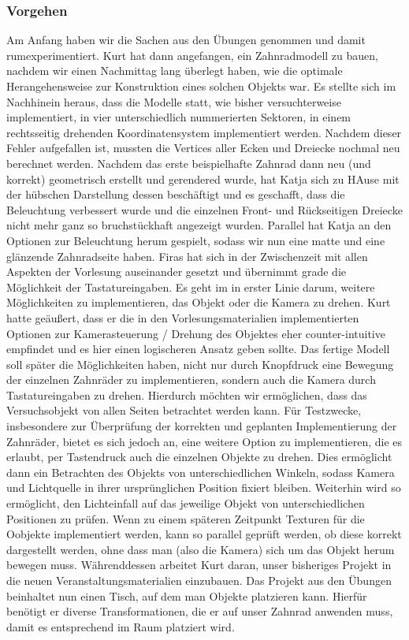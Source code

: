 \documentclass{article}
\begin{document}
\subsubsection{Vorgehen} %
Am Anfang haben wir die Sachen aus den Übungen genommen und damit rumexperimentiert. 
Kurt hat dann angefangen, ein Zahnradmodell zu bauen, nachdem wir einen Nachmittag lang überlegt haben, wie die optimale Herangehensweise zur Konstruktion eines solchen Objekts war. 
Es stellte sich im Nachhinein heraus, dass die Modelle statt, wie bisher versuchterweise implementiert, in vier unterschiedlich nummerierten Sektoren, in einem rechtsseitig drehenden Koordinatensystem implementiert werden. 
Nachdem dieser Fehler aufgefallen ist, mussten die Vertices aller Ecken und Dreiecke nochmal neu berechnet werden. 
Nachdem das erste beispielhafte Zahnrad dann neu (und korrekt) geometrisch erstellt und gerendered wurde, hat Katja sich zu HAuse mit der hübschen Darstellung dessen beschäftigt und es geschafft, dass die Beleuchtung verbessert wurde und die einzelnen Front- und Rückseitigen Dreiecke nicht mehr ganz so bruchstückhaft angezeigt wurden. Parallel hat Katja an den Optionen zur Beleuchtung herum gespielt, sodass wir nun eine matte und eine glänzende Zahnradseite haben. 
Firas hat sich in der Zwischenzeit mit allen Aspekten der Vorlesung auseinander gesetzt und übernimmt grade die Möglichkeit der Tastatureingaben. Es geht im in erster Linie darum, weitere Möglichkeiten zu implementieren, das Objekt oder die Kamera zu drehen. Kurt hatte geäußert, dass er die in den Vorlesungsmaterialien implementierten Optionen zur Kamerasteuerung / Drehung des Objektes eher counter-intuitive empfindet und es hier einen logischeren Ansatz geben sollte. 
Das fertige Modell soll später die Möglichkeiten haben, nicht nur durch Knopfdruck eine Bewegung der einzelnen Zahnräder zu implementieren, sondern auch die Kamera durch Tastatureingaben zu drehen. Hierdurch möchten wir ermöglichen, dass das Versuchsobjekt von allen Seiten betrachtet werden kann. 
Für Testzwecke, insbesondere zur Überprüfung der korrekten und geplanten Implementierung der Zahnräder, bietet es sich jedoch an, eine weitere Option zu implementieren, die es erlaubt, per Tastendruck auch die einzelnen Objekte zu drehen. Dies ermöglicht dann ein Betrachten des Objekts von unterschiedlichen Winkeln, sodass Kamera und Lichtquelle in ihrer ursprünglichen Position fixiert bleiben. Weiterhin wird so ermöglicht, den Lichteinfall auf das jeweilige Objekt von unterschiedlichen Positionen zu prüfen. Wenn zu einem späteren Zeitpunkt Texturen für die Oobjekte implementiert werden, kann so parallel geprüft werden, ob diese korrekt dargestellt werden, ohne dass man (also die Kamera) sich um das Objekt herum bewegen muss. 
Währenddessen arbeitet Kurt daran, unser bisheriges Projekt in die neuen Veranstaltungsmaterialien einzubauen. Das Projekt aus den Übungen beinhaltet nun einen Tisch, auf dem man Objekte platzieren kann. Hierfür benötigt er diverse Transformationen, die er auf unser Zahnrad anwenden muss, damit es entsprechend im Raum platziert wird. 
\end{document}
